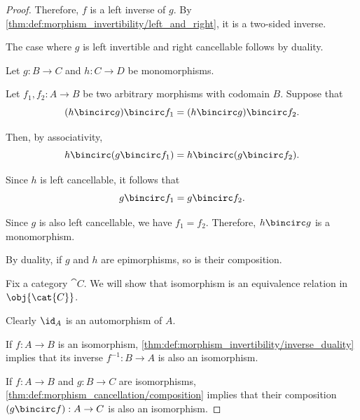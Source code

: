 \begin{proof}
  Therefore, \( f \) is a left inverse of \( g \). By \cref{thm:def:morphism_invertibility/left_and_right}, it is a two-sided inverse.

  The case where \( g \) is left invertible and right cancellable follows by duality.

   Let \( g: B \to C \) and \( h: C \to D \) be monomorphisms.

  Let \( f_1, f_2: A \to B \) be two arbitrary morphisms with codomain \( B \). Suppose that
  \begin{equation*}
    (h \bincirc g) \bincirc f_1 = (h \bincirc g) \bincirc f_2.
  \end{equation*}

  Then, by associativity,
  \begin{equation*}
    h \bincirc (g \bincirc f_1) = h \bincirc (g \bincirc f_2).
  \end{equation*}

  Since \( h \) is left cancellable, it follows that
  \begin{equation*}
    g \bincirc f_1 = g \bincirc f_2.
  \end{equation*}

  Since \( g \) is also left cancellable, we have \( f_1 = f_2 \). Therefore, \( h \bincirc g \) is a monomorphism.

  By duality, if \( g \) and \( h \) are epimorphisms, so is their composition.

   Fix a category \( \cat{C} \). We will show that isomorphism is an equivalence relation in \( \obj{\cat{C}} \).

   Clearly \( \id_A \) is an automorphism of \( A \).

   If \( f: A \to B \) is an isomorphism, \cref{thm:def:morphism_invertibility/inverse_duality} implies that its inverse \( f^{-1}: B \to A \) is also an isomorphism.

   If \( f: A \to B \) and \( g: B \to C \) are isomorphisms, \cref{thm:def:morphism_cancellation/composition} implies that their composition \( (g \bincirc f): A \to C \) is also an isomorphism.
\end{proof}

